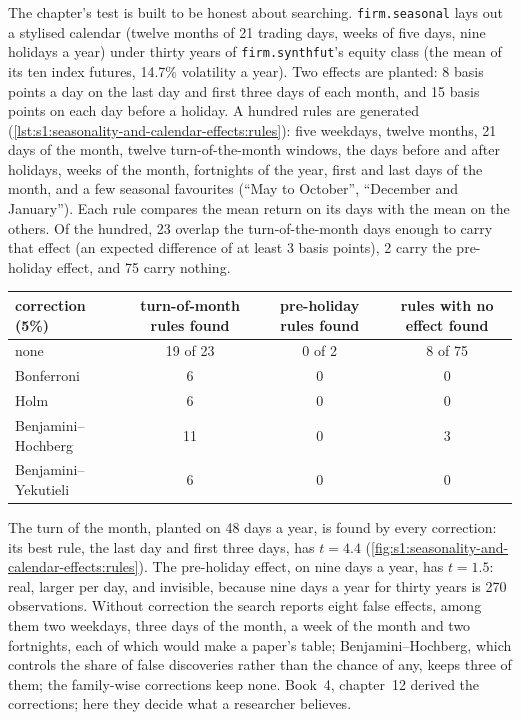 The chapter's test is built to be honest about searching. \texttt{firm.seasonal} lays out a stylised calendar (twelve months of 21 trading days, weeks
of five days, nine holidays a year) under thirty years of \texttt{firm.synthfut}'s equity class (the mean of its ten index futures, 14.7\% volatility a
year). Two effects are planted: 8 basis points a day on the last day and first three days of each month, and 15 basis points on each day before a
holiday. A hundred rules are generated (\cref{lst:s1:seasonality-and-calendar-effects:rules}): five weekdays, twelve months, 21 days of the month, twelve
turn-of-the-month windows, the days before and after holidays, weeks of the month, fortnights of the year, first and last days of the month, and a few
seasonal favourites (``May to October'', ``December and January''). Each rule compares the mean return on its days with the mean on the others. Of the
hundred, 23 overlap the turn-of-the-month days enough to carry that effect (an expected difference of at least 3 basis points), 2 carry the
pre-holiday effect, and 75 carry nothing.

\begin{center}
\small
\begin{tabular}{@{}lccc@{}}
\toprule
correction (5\%) & turn-of-month rules found & pre-holiday rules found & rules with no effect found\\
\midrule
none & 19 of 23 & 0 of 2 & 8 of 75\\
Bonferroni & 6 & 0 & 0\\
Holm & 6 & 0 & 0\\
Benjamini--Hochberg & 11 & 0 & 3\\
Benjamini--Yekutieli & 6 & 0 & 0\\
\bottomrule
\end{tabular}
\end{center}

The turn of the month, planted on 48 days a year, is found by every correction: its best rule, the last day and first three days, has $t = 4.4$
(\cref{fig:s1:seasonality-and-calendar-effects:rules}). The pre-holiday effect, on nine days a year, has $t = 1.5$: real, larger per day, and invisible,
because nine days a year for thirty years is 270 observations. Without correction the search reports eight false effects, among them two weekdays, three
days of the month, a week of the month and two fortnights, each of which would make a paper's table; Benjamini--Hochberg, which controls the share of false discoveries
rather than the chance of any, keeps three of them; the family-wise corrections keep none. Book~4, chapter~12 derived the corrections; here they decide
what a researcher believes.

